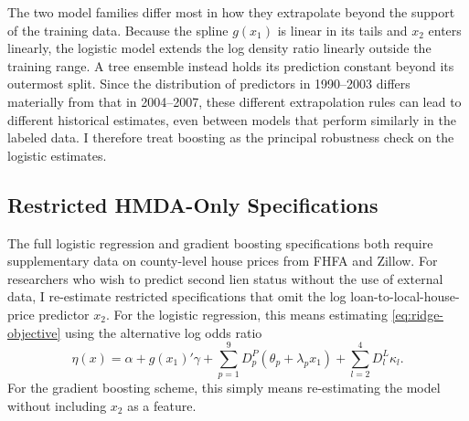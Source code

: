 \documentclass[letterpaper,12pt,usenames,dvipsnames]{article}
\newcommand{\pbrac}[1]{\left( #1 \right)}
\newcommand{\todo}[1]{\ifcomments{\color{red} [#1]}\fi}
\theoremstyle{definition}
\begin{document}
{The two model families differ most in how they extrapolate beyond the support of the training data. Because the spline $g(x_1)$ is linear in its tails and $x_2$ enters linearly, the logistic model extends the log density ratio linearly outside the training range. A tree ensemble instead holds its prediction constant beyond its outermost split. Since the distribution of predictors in 1990--2003 differs materially from that in 2004--2007, these different extrapolation rules can lead to different historical estimates, even between models that perform similarly in the labeled data. I therefore treat boosting as the principal robustness check on the logistic estimates.}

\subsection{Restricted HMDA-Only Specifications}

The full logistic regression and gradient boosting specifications both require supplementary data on county-level house prices from FHFA and Zillow. For researchers who wish to predict second lien status without the use of external data, I re-estimate restricted specifications that omit the log loan-to-local-house-price predictor $x_2$. For the logistic regression, this means estimating \eqref{eq:ridge-objective} using the alternative log odds ratio
\begin{equation}
	\eta(x) = \alpha + g(x_1)'\gamma 
	+ \sum_{p=1}^{9} D^{P}_{p} \pbrac{\theta_p + \lambda_p x_1}
	+ \sum_{l=2}^{4} D^{L}_{l} \kappa_l.
	\label{eq:logit-restricted}
\end{equation}
\todo{The selected HMDA-only logistic model (\texttt{logistic\_selection\_hmda\_only\_decision.csv}) is \texttt{hmda\_only\_\_spline\_lti\_\_none} with $C = 1$. It has the $x_1$ spline and the indicators, but no $x_1$-by-purchaser interactions ($\lambda_p$) and a different penalty. Equation \eqref{eq:logit-restricted} should drop the $\lambda_p x_1$ terms, and the text should note $C = 1$ (and, if relevant, that it was selected from the analogous eight-specification HMDA-only grid). The HMDA-only boosting search selected the same hyperparameters as the unrestricted model.}
For the gradient boosting scheme, this simply means re-estimating the model without including $x_2$ as a feature.

\begin{spacing}{1}
  {\small
    
	
  }
\end{spacing}
\end{document}
